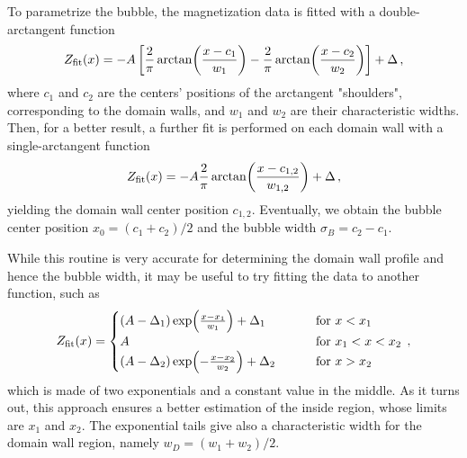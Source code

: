 To parametrize the bubble, the magnetization data is fitted with a double-arctangent function
\begin{equation}
    Z_{\rm fit}(x) = -A \left[\frac{2}{\pi}\arctan(\frac{x-c_1}{w_1}) - \frac{2}{\pi}\arctan(\frac{x-c_2}{w_2})\right] + \Delta\, ,
    \label{eq:double-atan}
\end{equation}
where $c_1$ and $c_2$ are the centers' positions of the arctangent "shoulders", corresponding to the domain walls, and $w_1$ and $w_2$ are their characteristic widths. 
Then, for a better result, a further fit is performed on each domain wall with a single-arctangent function
\begin{equation}
    Z_{\rm fit}(x) = -A \frac{2}{\pi}\arctan(\frac{x-c_{1,2}}{w_{1,2}}) + \Delta\, ,
    \label{eq:atan}
\end{equation}
yielding the domain wall center position $c_{1,2}$. Eventually, we obtain the bubble center position $x_0 = (c_1 + c_2)/2$ and the bubble width $\sigma_B = c_2 - c_1$.

While this routine is very accurate for determining the domain wall profile and hence the bubble width, it may be useful to try fitting the data to another function, such as
\begin{equation}
    Z_{\rm fit}(x) = 
    \begin{cases}
        (A-\Delta_1) \exp(\frac{x-x_1}{w_1}) + \Delta_1 \qquad\quad &\text{for } x < x_1\\
        A \qquad\qquad\qquad\qquad &\text{for } x_1 < x < x_2\\
        (A-\Delta_2) \exp(-\frac{x-x_2}{w_2}) + \Delta_2 \qquad &\text{for } x > x_2
    \end{cases}\, ,
    \label{eq:fit_exp}
\end{equation}
which is made of two exponentials and a constant value in the middle. As it turns out, this approach ensures a better estimation of the inside region, whose limits are $x_1$ and $x_2$. The exponential tails give also a characteristic width for the domain wall region, namely $w_D = (w_1 + w_2)/2$.

